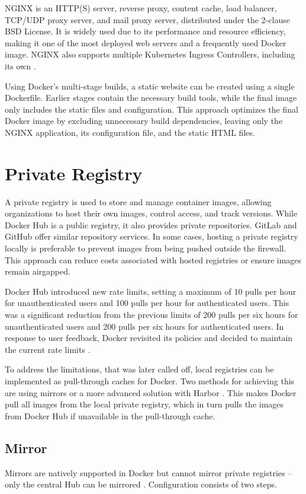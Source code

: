 NGINX is an HTTP(S) server, reverse proxy, content cache, load balancer, TCP/UDP proxy server, and mail proxy server, distributed under the 2-clause BSD License. It is widely used due to its performance and resource efficiency, making it one of the most deployed web servers and a frequently used Docker image. NGINX also supports multiple Kubernetes Ingress Controllers, including its own \Parencite{NginxWebsite}. 

Using Docker's multi-stage builds, a static website can be created using a single Dockerfile. Earlier stages contain the necessary build tools, while the final image only includes the static files and configuration. This approach optimizes the final Docker image by excluding unnecessary build dependencies, leaving only the NGINX application, its configuration file, and the static HTML files.

\section{Private Registry}
A private registry is used to store and manage container images, allowing organizations to host their own images, control access, and track versions. While Docker Hub is a public registry, it also provides private repositories. GitLab and GitHub offer similar repository services. In some cases, hosting a private registry locally is preferable to prevent images from being pushed outside the firewall. This approach can reduce costs associated with hosted registries or ensure images remain airgapped.

Docker Hub introduced new rate limits, setting a maximum of 10 pulls per hour for unauthenticated users and 100 pulls per hour for authenticated users. This was a significant reduction from the previous limits of 200 pulls per six hours for unauthenticated users and 200 pulls per six hours for authenticated users. In response to user feedback, Docker revisited its policies and decided to maintain the current rate limits \Parencite{DockerHubPolicies}.

To address the limitations, that was later called off, local registries can be implemented as pull-through caches for Docker. Two methods for achieving this are using mirrors \Parencite{dockerhubmirror} or a more advanced solution with Harbor \Parencite{harbor}. This makes Docker pull all images from the local private registry, which in turn pulls the images from Docker Hub if unavailable in the pull-through cache.

\subsection{Mirror}
Mirrors are natively supported in Docker but cannot mirror private registries -- only the central Hub can be mirrored \Parencite{dockerhubmirror}. Configuration consists of two steps.

